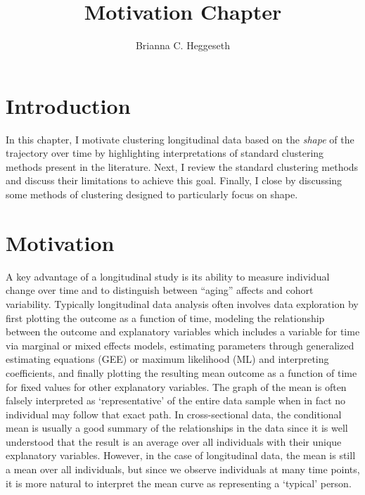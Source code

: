 \documentclass[12pt]{article}
\title{Motivation Chapter}
\author{Brianna C. Heggeseth}
\begin{document}
\doublespace
\maketitle
\section{Introduction}
 In this chapter, I motivate clustering longitudinal data based on the {\em shape} of the trajectory over time by highlighting interpretations of standard clustering methods present in the literature. Next, I review the standard clustering methods and discuss their limitations to achieve this goal. Finally, I close by discussing some methods of clustering designed to particularly focus on shape. 

\section{Motivation}
A key advantage of a longitudinal study is its ability to measure individual change over time and to distinguish between ``aging'' affects and cohort variability. Typically longitudinal data analysis often involves data exploration by first plotting the outcome as a function of time, modeling the relationship between the outcome and explanatory variables which includes a variable for time via marginal or mixed effects models, estimating parameters through generalized estimating equations (GEE) or maximum likelihood (ML) and interpreting coefficients, and finally plotting the resulting mean outcome as a function of time for fixed values for other explanatory variables. The graph of the mean is often falsely interpreted as `representative' of the entire data sample when in fact no individual may follow that exact path. In cross-sectional data, the conditional mean is usually a good summary of the relationships in the data since it is well understood that the result is an average over all individuals with their unique explanatory variables. However, in the case of longitudinal data, the mean is still a mean over all individuals, but since we observe individuals at many time points, it is more natural to interpret the mean curve as representing a `typical' person. \\\\
\end{document}
